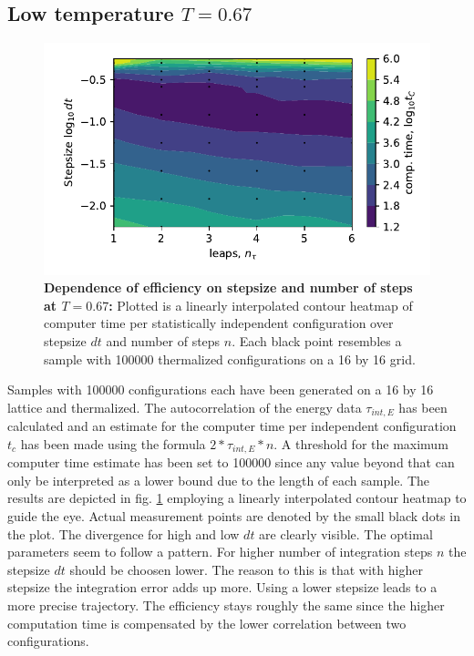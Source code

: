 \documentclass[11pt, a4paper]{scrartcl}
\begin{document}
\subsection{Low temperature $T = 0.67$}
    \begin{figure}
    \begin{centering}
        \includegraphics{low_T.pdf}
        \caption{\textbf{Dependence of efficiency on stepsize and number of steps at $T = 0.67$: } Plotted is a linearly interpolated contour heatmap of computer time per statistically independent configuration over stepsize $dt$ and number of steps $n$. Each black point resembles a sample with 100000 thermalized configurations on a 16 by 16 grid.}
    \end{centering}
    \label{lowT}
    \end{figure}
    Samples with 100000 configurations each have been generated on a 16 by 16 lattice and thermalized. The autocorrelation of the energy data $\tau_{int, E}$ has been calculated and an estimate for the computer time per independent configuration $t_c$ has been made using the formula $2*\tau_{int, E} * n$. A threshold for the maximum computer time estimate has been set to 100000 since any value beyond that can only be interpreted as a lower bound due to the length of each sample. The results are depicted in fig. \ref{lowT} employing a linearly interpolated contour heatmap to guide the eye. Actual measurement points are denoted by the small black dots in the plot. The divergence for high and low $dt$ are clearly visible. The optimal parameters seem to follow a pattern. For higher number of integration steps $n$ the stepsize $dt$ should be choosen lower. The reason to this is that with higher stepsize the integration error adds up more. Using a lower stepsize leads to a more precise trajectory. The efficiency stays roughly the same since the higher computation time is compensated by the lower correlation between two configurations.
\end{document}
